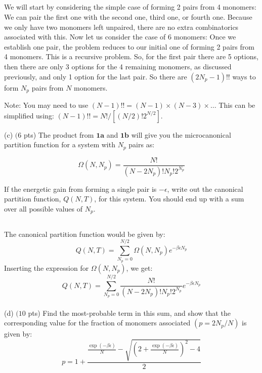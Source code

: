 \documentclass[12pt]{article}
\begin{document}
\subsection{}
We will start by considering the simple case of forming 2 pairs from 4 monomers:
We can pair the first one with the second one, third one, or fourth one. Because we only have two monomers left unpaired, there are no extra combinatorics associated with this. Now let us consider the case of 6 monomers: Once we establish one pair, the problem reduces to our initial one of forming 2 pairs from 4 monomers. This is a recursive problem. So, for the first pair there are 5 options, then there are only 3 options for the 4 remaining monomers, as discussed previously, and only 1 option for the last pair. So there are $(2N_p -1)!!$ ways to form $N_p$ pairs from $N$ monomers.

Note: You may need to use $(N-1) ! !=(N-1) \times(N-3) \times \ldots$ This can be simplified using: $(N-1) ! !=N ! /\left[(N / 2) ! 2^{N / 2}\right]$.

(c) $(6$ pts) The product from $\mathbf{1 a}$ and $\mathbf{1} \mathbf{b}$ will give you the microcanonical partition function for a system with $N_{p}$ pairs as:

$$
\Omega\left(N, N_{p}\right)=\frac{N !}{\left(N-2 N_{p}\right) ! N_{p} ! 2^{N_{p}}}
$$

If the energetic gain from forming a single pair is $-\epsilon$, write out the canonical partition function, $Q(N, T)$, for this system. You should end up with a sum over all possible values of $N_{p}$.
\subsection{}
The canonical partition function would be given by:
\begin{equation}
  Q(N, T) = \sum_{N_p=0}^{N/2} \Omega(N, N_p) e^{-\beta \epsilon N_p}
\end{equation}
Inserting the expression for $\Omega(N, N_p)$, we get:
\begin{equation}
  Q(N, T) = \sum_{N_p=0}^{N/2} \frac{N !}{\left(N-2 N_{p}\right) ! N_{p} ! 2^{N_{p}}} e^{-\beta \epsilon N_p}
\end{equation}
\\
(d) $(10$ pts) Find the most-probable term in this sum, and show that the corresponding value for the fraction of monomers associated $\left(p=2 N_{p} / N\right)$ is given by:
$$
p=1+\frac{\frac{\exp (-\beta \epsilon)}{N}-\sqrt{\left(2+\frac{\exp (-\beta \epsilon)}{N}\right)^{2}-4}}{2}
$$
\end{document}
